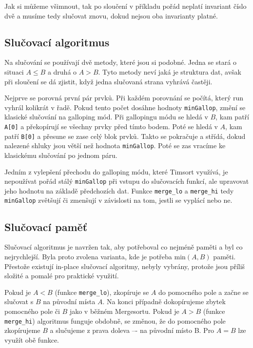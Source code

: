\documentclass[thesis=B,czech]{FITthesis}[2019/12/23]
\begin{document}
Jak si můžeme všimnout, tak po sloučení v příkladu pořád neplatí invariant číslo dvě a musíme tedy slučovat znovu, dokud nejsou oba invarianty platné.

\subsection{Slučovací algoritmus}
Na slučování se používají dvě metody, které jsou si podobné. Jedna se stará o situaci $ A \le B $ a druhá o $ A > B $. Tyto metody neví jaká je struktura dat, avšak při sloučení se dá zjistit, když jedna slučovaná strana vyhrává častěji. 

Nejprve se porovná první pár prvků. Při každém porovnání se počítá, který run vyhrál kolikrát v řadě. Pokud tento počet dosáhne hodnoty \texttt{minGallop}, změní se klasické slučování na galloping mód. Při gallopingu módu se hledá v $ B $, kam patří \texttt{A[0]} a překopírují se všechny prvky před tímto bodem. Poté se hledá v $ A $, kam patří \texttt{B[0]} a přesune se zase celý blok prvků. Takto se pokračuje a střídá, dokud nalezené shluky jsou větší než hodnota \texttt{minGallop}. Poté se zas vracíme ke klasickému slučování po jednom páru. 


Jedním z vylepšení přechodu do galloping módu, které Timsort využívá, je nepoužívat pořád stálý \texttt{minGallop} při vstupu do slučovacích funkcí, ale upravovat jeho hodnotu na základě předchozích dat. Funkce \texttt{merge\_lo} a \texttt{merge\_hi} tedy \texttt{minGallop} zvětšují či zmenšují v závislosti na tom, jestli se vyplácí nebo ne. 

\subsection{Slučovací paměť}
Slučovací algoritmus je navržen tak, aby potřeboval co nejméně paměti a byl co nejrychlejší. Byla proto zvolena varianta, kde je potřeba $ \textrm{min}(A,B) $ paměti. Přestože existují in-place slučovací algoritmy, nebyly vybrány, protože jsou příliš složité a pomalé pro praktické využití. 

Pokud je $ A < B $ (funkce \texttt{merge\_lo}), zkopíruje se $ A $ do pomocného pole a začne se slučovat s $ B $ na původní místa $ A $. Na konci případně dokopírujeme zbytek pomocného pole či $ B $ jako v běžném Mergesortu. Pokud je $ A > B $ (funkce \texttt{merge\_hi}) algoritmus funguje obdobně, se změnou, že do pomocného pole zkopírujeme $ B $ a slučujeme z prava doleva –- na původní místo B. Pro $ A = B $ lze využít obě funkce.
\end{document}
